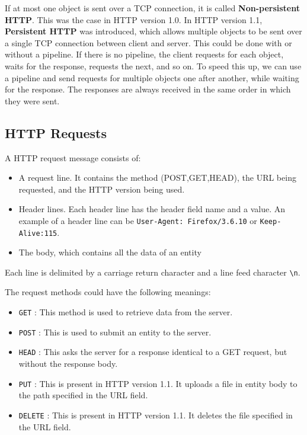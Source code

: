 \documentclass[12pt,letterpaper]{amsbook}
\theoremstyle{definition}
\begin{document}
If at most one object is sent over a TCP connection, it is called \textbf{Non-persistent HTTP}. This was the case in HTTP version 1.0. In HTTP version 1.1, \textbf{Persistent HTTP} was introduced, which allows multiple objects to be sent over a single TCP connection between client and server. This could be done with or without a pipeline. If there is no pipeline, the client requests for each object, waits for the response, requests the next, and so on. To speed this up, we can use a pipeline and send requests for multiple objects one after another, while waiting for the response. The responses are always received in the same order in which they were sent.

\subsection{HTTP Requests}

A HTTP request message consists of:

\begin{itemize}
  \item A request line. It contains the method (POST,GET,HEAD), the URL being requested, and the HTTP version being used.
  \item Header lines. Each header line has the header field name and a value. An example of a header line can be \texttt{User-Agent: Firefox/3.6.10} or \texttt{Keep-Alive:115}.
  \item The body, which contains all the data of an entity
\end{itemize}

Each line is delimited by a carriage return character  and a line feed character \texttt{\textbackslash n}.

The request methods could have the following meanings:

\begin{itemize}
  \item \texttt{GET} : This method is used to retrieve data from the server.
  \item \texttt{POST} : This is used to submit an entity to the server.
  \item \texttt{HEAD} : This asks the server for a response identical to a GET request, but without the response body.
  \item \texttt{PUT} : This is present in HTTP version 1.1. It uploads a file in entity body to the path specified in the URL field.
  \item \texttt{DELETE} : This is present in HTTP version 1.1. It deletes the file specified in the URL field.
\end{itemize}
\end{document}
